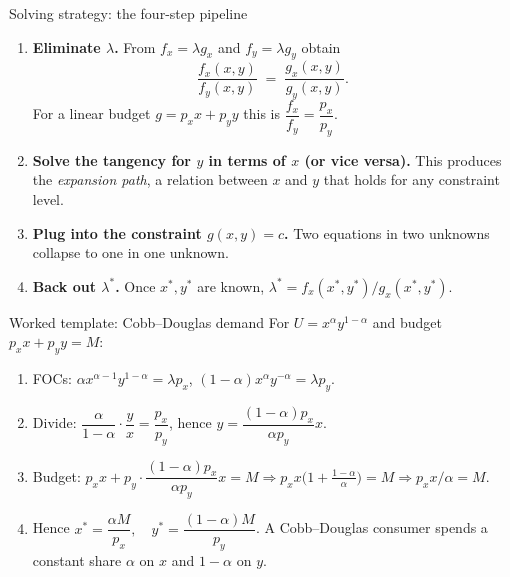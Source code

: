 \begin{rulebox}{Solving strategy: the four-step pipeline}
\begin{enumerate}[leftmargin=1.8em,itemsep=0.4ex]
  \item \textbf{Eliminate $\lambda$.} From $f_x = \lambda g_x$ and
        $f_y = \lambda g_y$ obtain
        \[
        \frac{f_x(x, y)}{f_y(x, y)} \;=\; \frac{g_x(x, y)}{g_y(x, y)}.
        \]
        For a linear budget $g = p_x x + p_y y$ this is
        $\dfrac{f_x}{f_y} = \dfrac{p_x}{p_y}$.
  \item \textbf{Solve the tangency for $y$ in terms of $x$ (or vice
        versa).} This produces the \emph{expansion path}, a relation
        between $x$ and $y$ that holds for any constraint level.
  \item \textbf{Plug into the constraint $g(x, y) = c$.} Two equations in
        two unknowns collapse to one in one unknown.
  \item \textbf{Back out $\lambda^*$.} Once $x^*, y^*$ are known,
        $\lambda^* = f_x(x^*, y^*)/g_x(x^*, y^*)$.
\end{enumerate}
\end{rulebox}

\begin{rulebox}{Worked template: Cobb--Douglas demand}
For $U = x^\alpha y^{1 - \alpha}$ and budget $p_x x + p_y y = M$:
\begin{enumerate}[leftmargin=1.8em,itemsep=0.4ex]
    \item FOCs: $\alpha x^{\alpha - 1} y^{1 - \alpha} = \lambda p_x$,
          $(1 - \alpha) x^\alpha y^{-\alpha} = \lambda p_y$.
    \item Divide: $\dfrac{\alpha}{1 - \alpha} \cdot \dfrac{y}{x} =
          \dfrac{p_x}{p_y}$, hence
          $y = \dfrac{(1 - \alpha) p_x}{\alpha p_y} x$.
    \item Budget: $p_x x + p_y \cdot \dfrac{(1 - \alpha) p_x}{\alpha p_y} x
          = M \Rightarrow p_x x \bigl(1 + \tfrac{1 - \alpha}{\alpha}\bigr)
          = M \Rightarrow p_x x / \alpha = M$.
    \item Hence $\boxed{x^* = \dfrac{\alpha M}{p_x}, \quad
          y^* = \dfrac{(1 - \alpha) M}{p_y}}$. A Cobb--Douglas consumer
          spends a constant share $\alpha$ on $x$ and $1 - \alpha$ on $y$.
\end{enumerate}
\end{rulebox}


